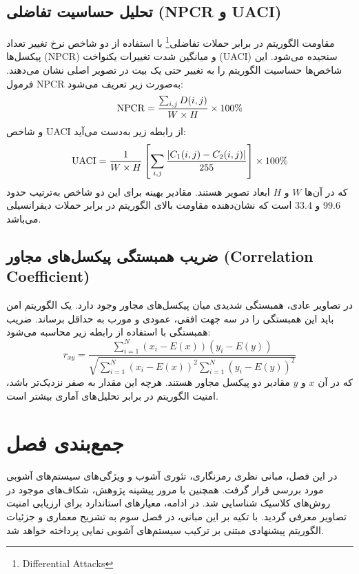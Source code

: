 \documentclass[a4paper,12pt]{report}
\renewcommand{\%}{\lr{\oldpercent}}
\providecommand{\lr}[1]{#1}
\providecommand{\LTRfootnote}[1]{\footnote{#1}}
\begin{document}
\subsection{تحلیل حساسیت تفاضلی (\protect\lr{NPCR} و \protect\lr{UACI})}
مقاومت الگوریتم در برابر حملات تفاضلی\LTRfootnote{Differential Attacks} با استفاده از دو شاخص نرخ تغییر تعداد پیکسل‌ها (\lr{NPCR}) و میانگین شدت تغییرات یکنواخت (\lr{UACI}) سنجیده می‌شود. این شاخص‌ها حساسیت الگوریتم را به تغییر حتی یک بیت در تصویر اصلی نشان می‌دهند.
فرمول \lr{NPCR} به‌صورت زیر تعریف می‌شود:
\begin{equation} \label{eq:npcr_def}
\mathrm{NPCR} = \frac{\sum_{i,j} D(i,j)}{W \times H} \times 100\text{\%}
\end{equation}
و شاخص \lr{UACI} از رابطه زیر به‌دست می‌آید:
\begin{equation} \label{eq:uaci_def}
\mathrm{UACI} = \frac{1}{W \times H} \left[ \sum_{i,j} \frac{|C_1(i,j) - C_2(i,j)|}{255} \right] \times 100\text{\%}
\end{equation}
که در آن‌ها $W$ و $H$ ابعاد تصویر هستند. مقادیر بهینه برای این دو شاخص به‌ترتیب حدود 99.6\% و 33.4\% است که نشان‌دهنده مقاومت بالای الگوریتم در برابر حملات دیفرانسیلی می‌باشد\cite{ref3}.

\subsection{ضریب همبستگی پیکسل‌های مجاور (\lr{Correlation Coefficient})}
در تصاویر عادی، همبستگی شدیدی میان پیکسل‌های مجاور وجود دارد. یک الگوریتم امن باید این همبستگی را در سه جهت افقی، عمودی و مورب به حداقل برساند. ضریب همبستگی با استفاده از رابطه زیر محاسبه می‌شود:
\begin{equation} \label{eq:correlation_def}
r_{xy} = \frac{\sum_{i=1}^N (x_i - E(x))(y_i - E(y))}{\sqrt{\sum_{i=1}^N (x_i - E(x))^2 \sum_{i=1}^N (y_i - E(y))^2}}
\end{equation}
که در آن $x$ و $y$ مقادیر دو پیکسل مجاور هستند. هرچه این مقدار به صفر نزدیک‌تر باشد، امنیت الگوریتم در برابر تحلیل‌های آماری بیشتر است\cite{ref10}.

\section{جمع‌بندی فصل}
در این فصل، مبانی نظری رمزنگاری، تئوری آشوب و ویژگی‌های سیستم‌های آشوبی مورد بررسی قرار گرفت. همچنین با مرور پیشینه پژوهش، شکاف‌های موجود در روش‌های کلاسیک شناسایی شد. در ادامه، معیارهای استاندارد برای ارزیابی امنیت تصاویر معرفی گردید. با تکیه بر این مبانی، در فصل سوم به تشریح معماری و جزئیات الگوریتم پیشنهادی مبتنی بر ترکیب سیستم‌های آشوبی نمایی پرداخته خواهد شد.
\end{document}
